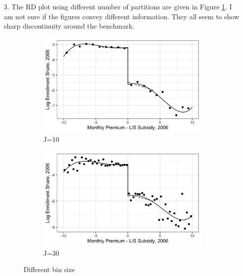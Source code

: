 \documentclass[12pt]{article}
\begin{document}
\begin{itemize}
\item[3.] The RD plot using different number of partitions are given in Figure \ref{fig:bins}. I am not sure if the figures convey different information. They all seem to show sharp discontinuity around the benchmark.
    \begin{figure} [ht]
    	\begin{subfigure}{.5\textwidth}
    		\centering
    		\includegraphics[scale=0.14]{../output/fig_rdplot_j10.jpg}
    		\caption{J=10}
    	\end{subfigure}%
       \begin{subfigure}{.5\textwidth}
    	\centering
    	\includegraphics[scale=0.14]{../output/fig_rdplot_j30.jpg}
    	\caption{J=30}
       \end{subfigure}
        \caption{Different bin size}
        \label{fig:bins}
    \end{figure}


\end{itemize}
\end{document}
